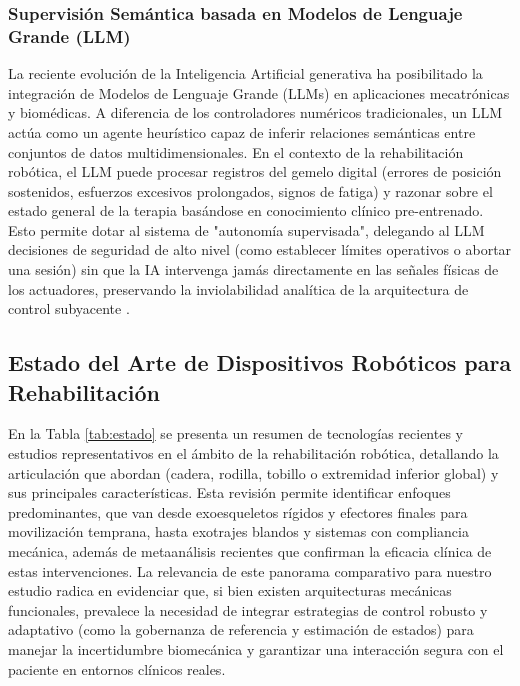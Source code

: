 \documentclass[a4paper,12pt]{article}
\begin{document}
\subsubsection{Supervisión Semántica basada en Modelos de Lenguaje Grande (LLM)}
La reciente evolución de la Inteligencia Artificial generativa ha posibilitado la integración de Modelos de Lenguaje Grande (LLMs) en aplicaciones mecatrónicas y biomédicas. A diferencia de los controladores numéricos tradicionales, un LLM actúa como un agente heurístico capaz de inferir relaciones semánticas entre conjuntos de datos multidimensionales. En el contexto de la rehabilitación robótica, el LLM puede procesar registros del gemelo digital (errores de posición sostenidos, esfuerzos excesivos prolongados, signos de fatiga) y razonar sobre el estado general de la terapia basándose en conocimiento clínico pre-entrenado. Esto permite dotar al sistema de "autonomía supervisada", delegando al LLM decisiones de seguridad de alto nivel (como establecer límites operativos o abortar una sesión) sin que la IA intervenga jamás directamente en las señales físicas de los actuadores, preservando la inviolabilidad analítica de la arquitectura de control subyacente \citep{rifai2024upper}.



\subsection{Estado del Arte de Dispositivos Robóticos para Rehabilitación}

En la Tabla \ref{tab:estado} se presenta un resumen de tecnologías recientes y estudios representativos en el ámbito de la rehabilitación robótica, detallando la articulación que abordan (cadera, rodilla, tobillo o extremidad inferior global) y sus principales características. Esta revisión permite identificar enfoques predominantes, que van desde exoesqueletos rígidos y efectores finales para movilización temprana, hasta exotrajes blandos y sistemas con compliancia mecánica, además de metaanálisis recientes que confirman la eficacia clínica de estas intervenciones. La relevancia de este panorama comparativo para nuestro estudio radica en evidenciar que, si bien existen arquitecturas mecánicas funcionales, prevalece la necesidad de integrar estrategias de control robusto y adaptativo (como la gobernanza de referencia y estimación de estados) para manejar la incertidumbre biomecánica y garantizar una interacción segura con el paciente en entornos clínicos reales.
\end{document}
